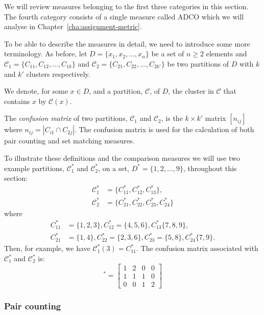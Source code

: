 \documentclass[a4paper]{report}
\newcommand{\dset}{D}
\newcommand{\clus}{\mathcal{C}}
\begin{document}
We will review measures belonging to the first three categories in this
section.  The fourth category consists of a single measure called ADCO which
we will analyse in Chapter~\ref{cha:assignment-metric}.

To be able to describe the measures in detail, we need to introduce some more
terminology.  As before, let $\dset = \{x_1,x_2,\dotsc,x_n\}$ be a set of $n
\geq 2$ elements and $\clus_1 = \{C_{11},C_{12},\dotsc,C_{1k}\}$ and $\clus_2
= \{C_{21},C_{22},\dotsc,C_{2k'}\}$ be two partitions of $\dset$ with $k$ and
$k'$ clusters respectively.

We denote, for some $x \in \dset$, and a partition, $\clus$, of $\dset$, the
cluster in $\clus$ that contains $x$ by $\clus(x)$.

The \textit{confusion matrix} of two partitions, $\clus_1$ and $\clus_2$, is
the $k \times k'$ matrix $[n_{ij}]$ where $n_{ij} = |C_{i1} \cap C_{2j}|$.
The confusion matrix is used for the calculation of both pair counting and set
matching measures.

To illustrate these definitions and the comparison measures we will use two
example partitions, $\clus^*_1$ and $\clus^*_2$, on a set, $\dset^* =
\{1,2,\dotsc,9\}$, throughout this section:
\begin{align*}
  \clus^*_1 &= \{C^*_{11},C^*_{12},C^*_{13}\}, \\
  \clus^*_2 &= \{C^*_{21},C^*_{22},C^*_{23},C^*_{24}\}
\end{align*}
where
\begin{align*}
  C^*_{11}&=\{1,2,3\},C^*_{12}=\{4,5,6\},C^*_{13}\{7,8,9\}, \\
  C^*_{21}&=\{1,4\},C^*_{22}=\{2,3,6\},C^*_{23}=\{5,8\},C^*_{24}\{7,9\}.
\end{align*}
Then, for example, we have $\clus^*_1(3) = C^*_{11}$.  The confusion matrix
associated with $\clus^*_1$ and $\clus^*_2$ is:
\begin{equation*}
  [n_{ij}]^*=\left[
  \begin{matrix}
    1 & 2 & 0 & 0 \\
    1 & 1 & 1 & 0 \\
    0 & 0 & 1 & 2
  \end{matrix}
  \right]
\end{equation*}

\subsubsection{Pair counting}
\label{sec:pair-counting}
\end{document}
